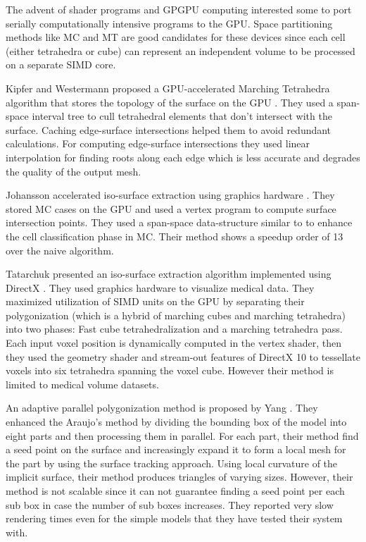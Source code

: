The advent of shader programs and GPGPU computing interested some to port serially computationally intensive programs to the GPU. 
Space partitioning methods like MC and MT are good candidates for these devices since each cell (either tetrahedra or
cube) can represent an independent volume to be processed on a separate SIMD core. 

Kipfer and Westermann proposed a GPU-accelerated Marching Tetrahedra algorithm that stores the topology of the
surface on the GPU \cite{Kipfer2005}. They used a span-space interval tree to cull tetrahedral elements that don't intersect with the 
surface. Caching edge-surface intersections helped them to avoid redundant calculations. For computing edge-surface intersections they used
linear interpolation for finding roots along each edge which is less accurate and degrades the quality of the output mesh.  

Johansson \etal accelerated iso-surface extraction using graphics hardware \cite{Johansson2006}. They stored MC cases on the GPU 
and used a vertex program to compute surface intersection points. They used a span-space data-structure similar to \cite{Cignoni1997} to
enhance the cell classification phase in MC. Their method shows a speedup order of 13 over the naive algorithm.  


Tatarchuk \etal presented an iso-surface extraction algorithm implemented using DirectX \cite{Tatarchuk2008}. They used graphics 
hardware to visualize medical data. They maximized utilization of SIMD units on the GPU by separating their polygonization (which is a 
hybrid of marching cubes and marching tetrahedra) into two phases: Fast cube tetrahedralization and a marching tetrahedra pass. Each input 
voxel position is dynamically computed in the vertex shader, then they used the geometry shader and stream-out features of DirectX 10 to 
tessellate voxels into six tetrahedra spanning the voxel cube. However their method is limited to medical volume datasets.

An adaptive parallel polygonization method is proposed by Yang \etal \cite{Yang2010}. They enhanced the Araujo's method 
\cite{Rodriguesdearaujo2005} by dividing the bounding box of the model into eight parts and then processing them in parallel.
For each part, their method find a seed point on the surface and increasingly expand it to form a 
local mesh for the part by using the surface tracking approach. Using local curvature of the implicit 
surface, their method produces triangles of varying sizes. However, their method is not scalable since 
it can not guarantee finding a seed point per each sub box in case the number of sub boxes increases. 
They reported very slow rendering times even for the simple models that they have tested their system with. 


